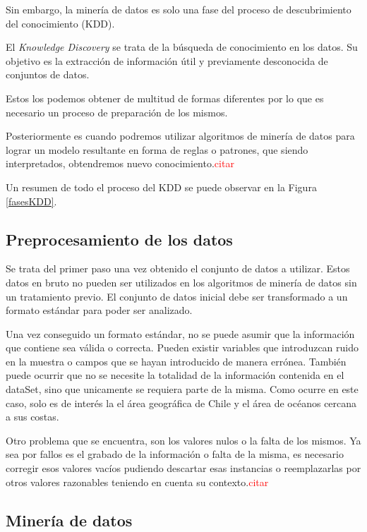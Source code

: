 Sin embargo, la minería de datos es solo una fase del proceso de descubrimiento del conocimiento (KDD).

El \emph{Knowledge Discovery} se trata de la búsqueda de conocimiento en los datos. Su objetivo es la extracción de información útil y previamente desconocida de conjuntos de datos.

Estos los podemos obtener de multitud de formas diferentes por lo que es necesario un proceso de preparación de los mismos.

Posteriormente es cuando podremos utilizar algoritmos de minería de datos para lograr un modelo resultante en forma de reglas o patrones, que siendo interpretados, obtendremos nuevo conocimiento.\textcolor{red}{citar}

Un resumen de todo el proceso del KDD se puede observar en la Figura \ref{fasesKDD}.

\label{fasesKDD}

\subsection{Preprocesamiento de los datos}
Se trata del primer paso una vez obtenido el conjunto de datos a utilizar. Estos datos en bruto no pueden ser utilizados en los algoritmos de minería de datos sin un tratamiento previo. El conjunto de datos inicial debe ser transformado a un formato estándar para poder ser analizado.

Una vez conseguido un formato estándar, no se puede asumir que la información que contiene sea válida o correcta. Pueden existir variables que introduzcan ruido en la muestra o campos que se hayan introducido de manera errónea. También puede ocurrir que no se necesite la totalidad de la información contenida en el dataSet, sino que unicamente se requiera parte de la misma. Como ocurre en este caso, solo es de interés la el área geográfica de Chile y el área de océanos cercana a sus costas.

Otro problema que se encuentra, son los valores nulos o la falta de los mismos. Ya sea por fallos es el grabado de la información o falta de la misma, es necesario corregir esos valores vacíos pudiendo descartar esas instancias o reemplazarlas por otros valores razonables teniendo en cuenta su contexto.\textcolor{red}{citar}


\subsection{Minería de datos}









